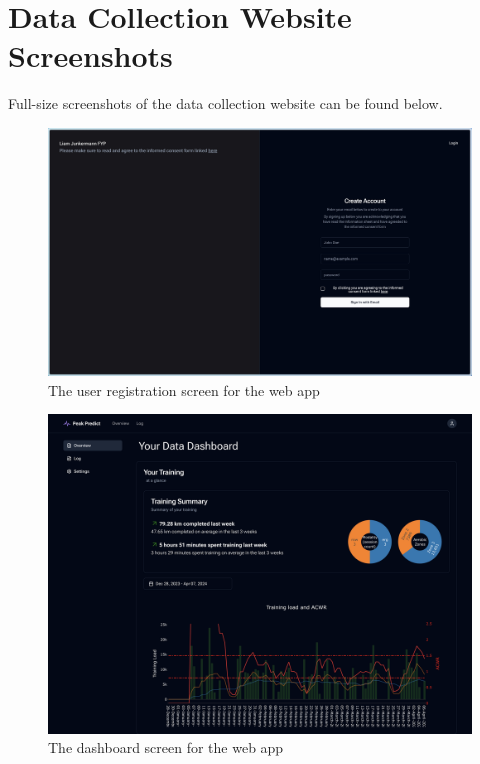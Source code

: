 \newpage
\section{Data Collection Website Screenshots}
Full-size screenshots of the data collection website can be found below.
\begin{figure}[!hp]
  \centering
  \includegraphics[width=\textwidth]{figures/fyp_register.jpeg}
  \captionsetup{justification=centering}
  \caption*{The user registration screen for the web app} \label{fig:app_webapp_register}
\end{figure}
\begin{figure}[!hp]
  \centering
  \includegraphics[width=\textwidth]{figures/fyp_dash_overview.png}
  \captionsetup{justification=centering}
  \caption*{The dashboard screen for the web app} \label{fig:app_webapp_dashboard}
\end{figure}
